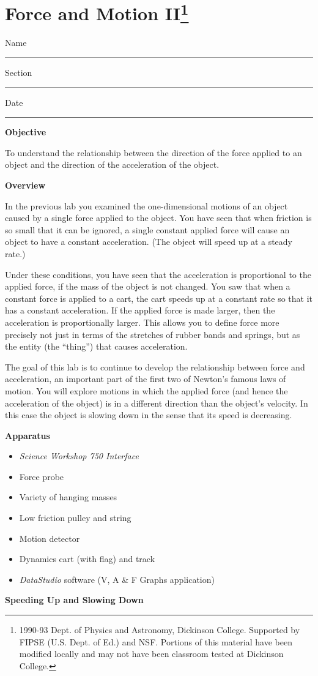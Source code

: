 
\section{Force and Motion II\footnote{
1990-93 Dept. of Physics and Astronomy, Dickinson College. Supported by FIPSE
(U.S. Dept. of Ed.) and NSF. Portions of this material have been modified locally
and may not have been classroom tested at Dickinson College.
}}

Name \rule{2.0in}{0.1pt}\hfill{}Section \rule{1.0in}{0.1pt}\hfill{}Date \rule{1.0in}{0.1pt}

\textbf{Objective} 

To understand the relationship between the direction of the force applied to
an object and the direction of the acceleration of the object. 

\textbf{Overview} 

In the previous lab you examined the one-dimensional motions of an object caused
by a single force applied to the object. You have seen that when friction is
so small that it can be ignored, a single constant applied force will cause
an object to have a constant acceleration. (The object will speed up at a steady
rate.) 

Under these conditions, you have seen that the acceleration is proportional
to the applied force, if the mass of the object is not changed. You saw that
when a constant force is applied to a cart, the cart speeds up at a constant
rate so that it has a constant acceleration. If the applied force is made larger,
then the acceleration is proportionally larger. This allows you to define force
more precisely not just in terms of the stretches of rubber bands and springs,
but as the entity (the ``thing'') that causes acceleration.

The goal of this lab is to continue to develop the relationship between force
and acceleration, an important part of the first two of Newton's famous laws
of motion. You will explore motions in which the applied force (and hence the
acceleration of the object) is in a different direction than the object's velocity.
In this case the object is slowing down in the sense that its speed is decreasing.

\textbf{Apparatus }

\begin{itemize}
\item \textit{Science Workshop 750 Interface}
\item Force probe 
\item Variety of hanging masses 
\item Low friction pulley and string 
\item Motion detector 
\item Dynamics cart (with flag) and track 
\item \textit{DataStudio} software (V, A \& F Graphs application)
\end{itemize}
\textbf{Speeding Up and Slowing Down }

